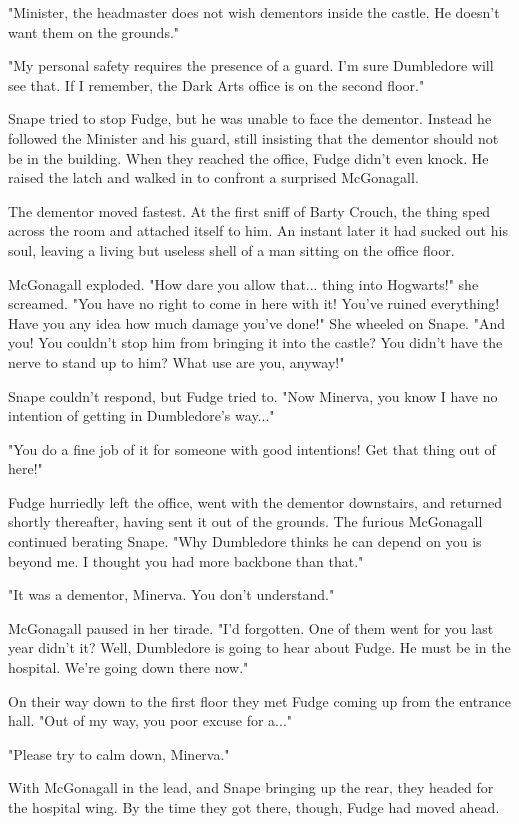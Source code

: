 \documentclass[a4paper,11pt]{article}
\begin{document}
"Minister, the headmaster does not wish dementors inside the castle. He doesn't want them on the grounds."

"My personal safety requires the presence of a guard. I'm sure Dumbledore will see that. If I remember, the Dark Arts office is on the second floor."

Snape tried to stop Fudge, but he was unable to face the dementor. Instead he followed the Minister and his guard, still insisting that the dementor should not be in the building. When they reached the office, Fudge didn't even knock. He raised the latch and walked in to confront a surprised McGonagall.

The dementor moved fastest. At the first sniff of Barty Crouch, the thing sped across the room and attached itself to him. An instant later it had sucked out his soul, leaving a living but useless shell of a man sitting on the office floor.

McGonagall exploded. "How dare you allow that... thing into Hogwarts!" she screamed. "You have no right to come in here with it! You've ruined everything! Have you any idea how much damage you've done!" She wheeled on Snape. "And you! You couldn't stop him from bringing it into the castle? You didn't have the nerve to stand up to him? What use are you, anyway!"

Snape couldn't respond, but Fudge tried to. "Now Minerva, you know I have no intention of getting in Dumbledore's way..."

"You do a fine job of it for someone with good intentions! Get that thing out of here!"

Fudge hurriedly left the office, went with the dementor downstairs, and returned shortly thereafter, having sent it out of the grounds. The furious McGonagall continued berating Snape. "Why Dumbledore thinks he can depend on you is beyond me. I thought you had more backbone than that."

"It was a dementor, Minerva. You don't understand."

McGonagall paused in her tirade. "I'd forgotten. One of them went for you last year didn't it? Well, Dumbledore is going to hear about Fudge. He must be in the hospital. We're going down there now."

On their way down to the first floor they met Fudge coming up from the entrance hall. "Out of my way, you poor excuse for a..."

"Please try to calm down, Minerva."

With McGonagall in the lead, and Snape bringing up the rear, they headed for the hospital wing. By the time they got there, though, Fudge had moved ahead.
\end{document}
